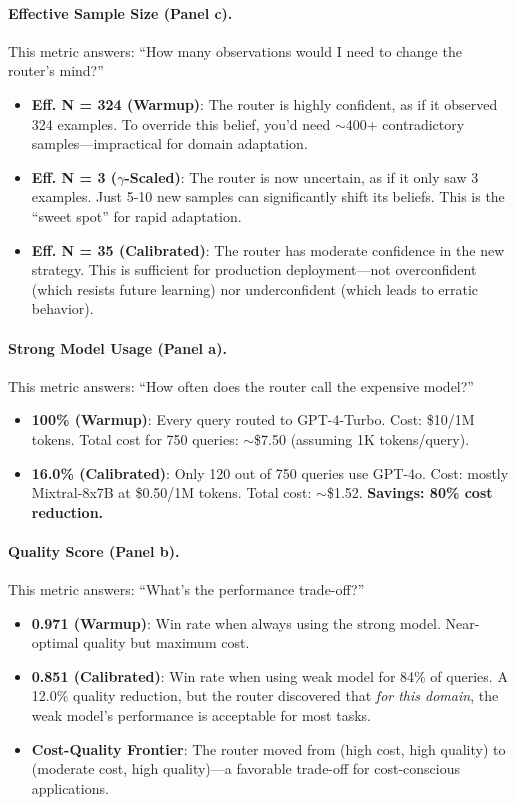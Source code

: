 \paragraph{Effective Sample Size (Panel c).} This metric answers: ``How many observations would I need to change the router's mind?''
\begin{itemize}
    \item \textbf{Eff. N = 324 (Warmup)}: The router is highly confident, as if it observed 324 examples. To override this belief, you'd need $\sim$400+ contradictory samples—impractical for domain adaptation.
    \item \textbf{Eff. N = 3 ($\gamma$-Scaled)}: The router is now uncertain, as if it only saw 3 examples. Just 5-10 new samples can significantly shift its beliefs. This is the ``sweet spot'' for rapid adaptation.
    \item \textbf{Eff. N = 35 (Calibrated)}: The router has moderate confidence in the new strategy. This is sufficient for production deployment—not overconfident (which resists future learning) nor underconfident (which leads to erratic behavior).
\end{itemize}

\paragraph{Strong Model Usage (Panel a).} This metric answers: ``How often does the router call the expensive model?''
\begin{itemize}
    \item \textbf{100\% (Warmup)}: Every query routed to GPT-4-Turbo. Cost: \$10/1M tokens. Total cost for 750 queries: $\sim$\$7.50 (assuming 1K tokens/query).
    \item \textbf{16.0\% (Calibrated)}: Only 120 out of 750 queries use GPT-4o. Cost: mostly Mixtral-8x7B at \$0.50/1M tokens. Total cost: $\sim$\$1.52. \textbf{Savings: 80\% cost reduction.}
\end{itemize}

\paragraph{Quality Score (Panel b).} This metric answers: ``What's the performance trade-off?''
\begin{itemize}
    \item \textbf{0.971 (Warmup)}: Win rate when always using the strong model. Near-optimal quality but maximum cost.
    \item \textbf{0.851 (Calibrated)}: Win rate when using weak model for 84\% of queries. A 12.0\% quality reduction, but the router discovered that \emph{for this domain}, the weak model's performance is acceptable for most tasks.
    \item \textbf{Cost-Quality Frontier}: The router moved from (high cost, high quality) to (moderate cost, high quality)—a favorable trade-off for cost-conscious applications.
\end{itemize}

